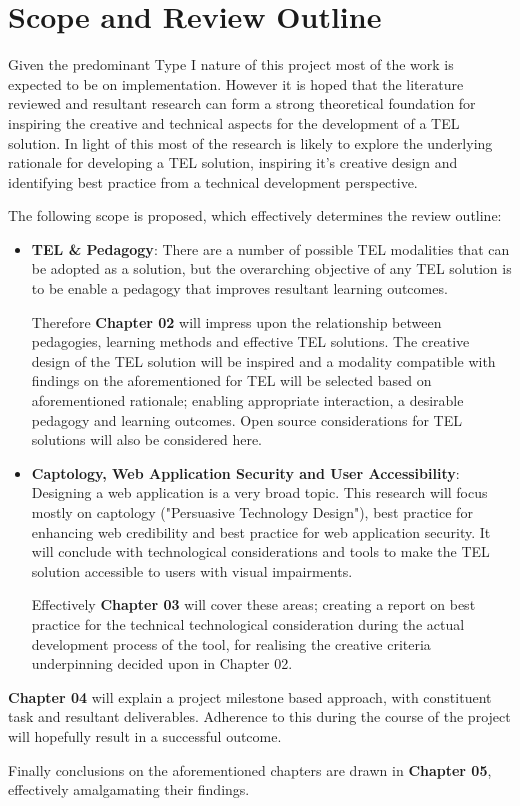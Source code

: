 
\section{Scope and Review Outline}
\label{sec:sec01}

Given the predominant Type I nature of this project most of the work is expected to be on implementation.  However it is hoped that the literature reviewed and resultant research can form a strong theoretical foundation for inspiring the creative and technical aspects for the development of a TEL solution. In light of this most of the research is likely to explore the underlying rationale for developing a TEL solution, inspiring it's creative design and identifying best practice from a technical development perspective.

The following scope is proposed, which effectively determines the review outline:

\begin{itemize}

\item\textbf{TEL \& Pedagogy}: There are a number of possible TEL modalities that can be adopted as a solution, but the  overarching objective of any TEL solution is to be enable a pedagogy that improves resultant learning outcomes.

Therefore \textbf{Chapter 02} will impress upon the relationship between pedagogies, learning methods and effective TEL solutions. The creative design of the TEL solution will be inspired and a modality compatible with findings on the aforementioned for TEL will be selected based on aforementioned rationale; enabling appropriate interaction, a desirable pedagogy and learning outcomes. Open source considerations for TEL solutions will also be considered here.


\item\textbf {Captology, Web Application Security and User Accessibility}: Designing a web application is a very broad topic. This research will focus mostly on captology ("Persuasive Technology Design"), best practice for enhancing web credibility and best practice for web application security. It will conclude with technological considerations and tools to make the TEL solution accessible to users with visual impairments. 

Effectively \textbf{Chapter 03} will cover these areas; creating  a report on best practice for the technical technological consideration during the actual development process of the tool, for realising the creative criteria underpinning decided upon in Chapter 02.

\end{itemize}

\textbf{Chapter 04} will explain a project milestone based approach, with constituent task and resultant deliverables. Adherence to this during the course of the project will hopefully result in a successful outcome.

Finally conclusions on the aforementioned chapters are drawn in \textbf{Chapter 05}, effectively amalgamating their findings.


